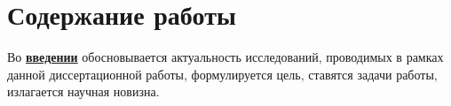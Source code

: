 \section*{Содержание работы}
Во \underline{\textbf{введении}} обосновывается актуальность
исследований, проводимых в рамках данной диссертационной работы,
формулируется цель, ставятся задачи работы, излагается научная новизна.





